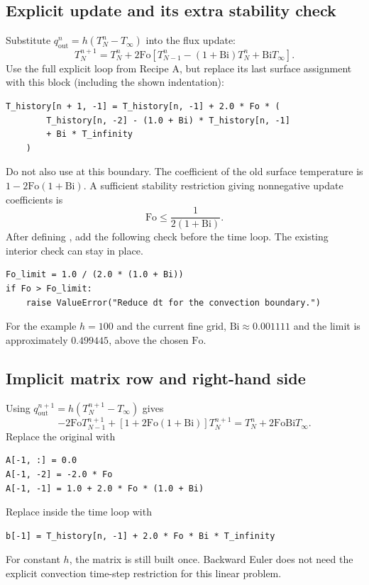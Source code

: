 \documentclass[11pt,letterpaper]{article}
\newcommand{\Fo}{\mathrm{Fo}}
\newcommand{\Bi}{\mathrm{Bi}}
\newcommand{\code}[1]{\texttt{\detokenize{#1}}}
\begin{document}
\subsection*{Explicit update and its extra stability check}
Substitute $q_{\mathrm{out}}^n=h(T_N^n-T_\infty)$ into the flux update:
\[
 T_N^{n+1}=T_N^n+2\Fo
 \left[T_{N-1}^n-(1+\Bi)T_N^n+\Bi T_\infty\right].
\]
Use the full explicit loop from Recipe A, but replace its last surface
assignment with this block (including the shown indentation):
\begin{lstlisting}[label=lst:explicitrobin]
    T_history[n + 1, -1] = T_history[n, -1] + 2.0 * Fo * (
        T_history[n, -2] - (1.0 + Bi) * T_history[n, -1]
        + Bi * T_infinity
    )
\end{lstlisting}
Do not also use \code{q_flux} at this boundary. The coefficient of the
old surface temperature is $1-2\Fo(1+\Bi)$. A sufficient stability
restriction giving nonnegative update coefficients is
\[
 \Fo\le\frac{1}{2(1+\Bi)}.
\]
After defining \code{Bi}, add the following check before the time loop.
The existing interior check can stay in place.
\begin{lstlisting}[label=lst:robincheck]
Fo_limit = 1.0 / (2.0 * (1.0 + Bi))
if Fo > Fo_limit:
    raise ValueError("Reduce dt for the convection boundary.")
\end{lstlisting}
For the example $h=100$ and the current fine grid, $\Bi\approx0.001111$
and the limit is approximately $0.499445$, above the chosen $\Fo$.


\subsection*{Implicit matrix row and right-hand side}
Using $q_{\mathrm{out}}^{n+1}=h(T_N^{n+1}-T_\infty)$ gives
\[
 -2\Fo T_{N-1}^{n+1}+[1+2\Fo(1+\Bi)]T_N^{n+1}
 =T_N^n+2\Fo\Bi T_\infty.
\]
Replace the original \code{A[-1, -1] = 1.0} with
\begin{lstlisting}[label=lst:implicitrobinmatrix]
A[-1, :] = 0.0
A[-1, -2] = -2.0 * Fo
A[-1, -1] = 1.0 + 2.0 * Fo * (1.0 + Bi)
\end{lstlisting}
Replace \code{b[-1] = T_right} inside the time loop with
\begin{lstlisting}[label=lst:implicitrobinrhs]
    b[-1] = T_history[n, -1] + 2.0 * Fo * Bi * T_infinity
\end{lstlisting}
For constant $h$, the matrix is still built once. Backward Euler does not
need the explicit convection time-step restriction for this linear problem.
\end{document}
